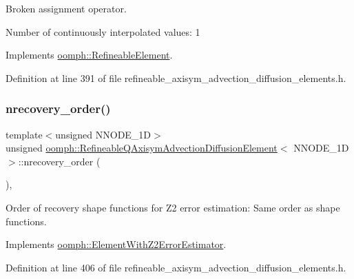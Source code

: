Broken assignment operator. 

Number of continuously interpolated values\+: 1 

Implements \hyperlink{classoomph_1_1RefineableElement_a53e171a18c9f43f1db90a6876516a073}{oomph\+::\+Refineable\+Element}.



Definition at line 391 of file refineable\+\_\+axisym\+\_\+advection\+\_\+diffusion\+\_\+elements.\+h.

\mbox{\label{classoomph_1_1RefineableQAxisymAdvectionDiffusionElement_a2e76935da40425bf2a099f1f25e51f1c}} 
\subsubsection{\texorpdfstring{nrecovery\+\_\+order()}{nrecovery\_order()}}
{\footnotesize\ttfamily template$<$unsigned N\+N\+O\+D\+E\+\_\+1D$>$ \\
unsigned \hyperlink{classoomph_1_1RefineableQAxisymAdvectionDiffusionElement}{oomph\+::\+Refineable\+Q\+Axisym\+Advection\+Diffusion\+Element}$<$ N\+N\+O\+D\+E\+\_\+1D $>$\+::nrecovery\+\_\+order (\begin{DoxyParamCaption}{ }\end{DoxyParamCaption})\hspace{0.3cm}{\ttfamily [inline]}, {\ttfamily [virtual]}}



Order of recovery shape functions for Z2 error estimation\+: Same order as shape functions. 



Implements \hyperlink{classoomph_1_1ElementWithZ2ErrorEstimator_af39480835bd3e0f6b2f4f7a9a4044798}{oomph\+::\+Element\+With\+Z2\+Error\+Estimator}.



Definition at line 406 of file refineable\+\_\+axisym\+\_\+advection\+\_\+diffusion\+\_\+elements.\+h.

\mbox{\label{classoomph_1_1RefineableQAxisymAdvectionDiffusionElement_a33f8787ec034fe65cd2b2bb00cfbf9dc}} 
